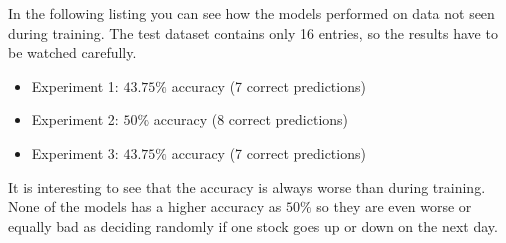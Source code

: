 In the following listing you can see how the models performed on data not seen during training. The test dataset contains only 16 entries, so the results have to be watched carefully.
\begin{itemize}
	\item Experiment 1: $43.75\%$ accuracy (7 correct predictions)
	\item Experiment 2: $50\%$ accuracy (8 correct predictions)
	\item Experiment 3: $43.75\%$ accuracy (7 correct predictions)
\end{itemize}
It is interesting to see that the accuracy is always worse than during training. None of the models has a higher accuracy as $50\%$ so they are even worse or equally bad as deciding randomly if one stock goes up or down on the next day.
